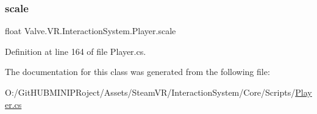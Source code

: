 \mbox{\label{class_valve_1_1_v_r_1_1_interaction_system_1_1_player_ad14b51d09391a08cb5c6a293ce8f0c40}} 
\subsubsection{\texorpdfstring{scale}{scale}}
{\footnotesize\ttfamily float Valve.\+V\+R.\+Interaction\+System.\+Player.\+scale\hspace{0.3cm}{\ttfamily [get]}}



Definition at line 164 of file Player.\+cs.



The documentation for this class was generated from the following file\+:\begin{DoxyCompactItemize}
\item 
O\+:/\+Git\+H\+U\+B\+M\+I\+N\+I\+P\+Roject/\+Assets/\+Steam\+V\+R/\+Interaction\+System/\+Core/\+Scripts/\mbox{\hyperlink{_player_8cs}{Player.\+cs}}\end{DoxyCompactItemize}
